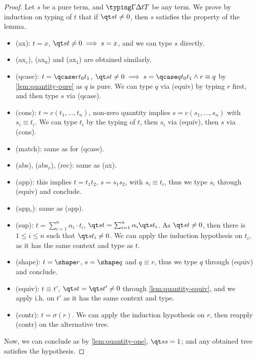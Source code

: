 \begin{proof}
  Let $s$ be a pure term, and $\typing \Gamma \Delta t T$ be any term.
  We prove by induction on typing of $t$ that if $\qt s t \neq 0$,
  then $s$ satisfies the property of the lemma.
  \begin{itemize}
    \item (ax): $t = x$, $\qt s t \neq 0 \implies s = x$, and we can
      type $s$ directly.
    \item (ax$_c$), (ax$_0$) and (ax$_1$) are obtained similarly.
    \item (qcase): $t = \qcase r {t_0} {t_1}$, $\qt s t \neq 0
      \implies s = \qcase q {t_0} {t_1} \wedge r \equiv q$ by
      \autoref{lem:quantity-pure} as $q$ is pure.
      We can type $q$ via (equiv) by typing $r$ first, and then type
      $s$ via (qcase).
    \item (cons): $t = c(t_1, \dots, t_n)$, non-zero quantity implies
      $s = c(s_1, \dots, s_n)$ with $s_i \equiv t_i$.
      We can type $t_i$ by the typing of $t$, then $s_i$ via (equiv),
      then $s$ via (cons).
    \item (match): same as for (qcase).
    \item (abs), (abs$_c$), (rec): same as (ax).
    \item (app): this implies $t = t_1 t_2$, $s = s_1s_2$, with $s_i
      \equiv t_i$, thus we type $s_i$ through (equiv) and conclude.
    \item (app$_c$): same as (app).
    \item (sup): $t = \sum_{i=1}^n \alpha_i \cdot t_i$, $\qt s t =
      \sum_{i=1}^n \alpha_i \qt s {t_i}$.
      As $\qt s t \neq 0$, then there is $1 \leq i \leq n$ such that
      $\qt s {t_i} \neq 0$.
      We can apply the induction hypothesis on $t_i$, as it has the
      same context and type as $t$.
    \item (shape): $t = \shape r$, $s = \shape q$ and $q \equiv r$,
      thus we type $q$ through (equiv) and conclude.
    \item (equiv): $t \equiv t'$, $\qt s t = \qt s t' \neq 0$ through
      \autoref{lem:quantity-equiv}, and we apply i.h. on $t'$ as it
      has the same context and type.
    \item (contr): $t = \sigma(r)$. We can apply the induction
      hypothesis on $r$, then reapply (contr) on the alternative tree.
  \end{itemize}

  Now, we can conclude as by \autoref{lem:quantity-one}, $\qt s s =
  1$; and any obtained tree satisfies the hypothesis. \qedhere
\end{proof}

